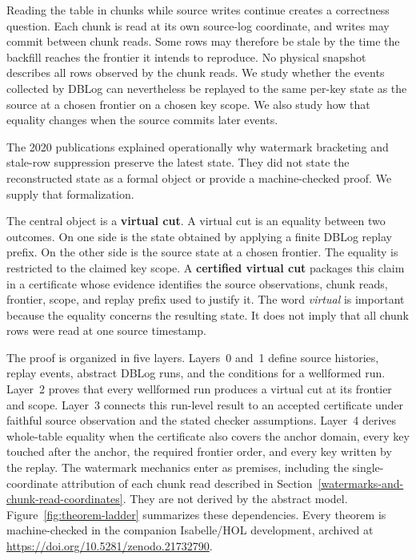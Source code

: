 \documentclass[letterpaper,10pt,twocolumn]{article}
\begin{document}
Reading the table in chunks while source writes continue creates a
correctness question. Each chunk is read at its own source-log
coordinate, and writes may commit between
chunk reads. Some rows may therefore be stale by the time the backfill
reaches the frontier it intends to reproduce. No physical snapshot
describes all rows observed by the chunk reads. We study whether the
events collected by DBLog can nevertheless be replayed to the same
per-key state as the source at a chosen frontier on a chosen key scope.
We also study how that equality changes when the source commits later
events.

The 2020 publications explained operationally why watermark bracketing
and stale-row suppression preserve the latest state. They did not state
the reconstructed state as a formal object or provide a machine-checked
proof. We supply that formalization.

The central object is a \textbf{virtual cut}. A virtual cut is an
equality between two outcomes. On one side is the state obtained by
applying a finite DBLog replay prefix. On the other side is the source
state at a chosen frontier. The equality is restricted to the claimed
key scope. A \textbf{certified virtual cut} packages this claim in a
certificate whose evidence identifies the source observations, chunk
reads, frontier, scope, and replay prefix used to justify it. The word
\emph{virtual} is important because the equality concerns the resulting
state. It does not imply that all chunk rows were read at one source
timestamp.

The proof is organized in five layers. Layers~0 and~1 define source
histories, replay events, abstract DBLog runs, and the conditions for a
wellformed run. Layer~2 proves that every wellformed run produces a
virtual cut at its frontier and scope. Layer~3 connects this run-level
result to an accepted certificate under faithful source observation and
the stated checker assumptions. Layer~4 derives whole-table equality
when the certificate also covers the anchor domain, every key touched
after the anchor, the required frontier order, and every key written by
the replay. The watermark mechanics enter as premises, including the
single-coordinate attribution of each chunk read described in
Section~\ref{watermarks-and-chunk-read-coordinates}. They are not
derived by the abstract model. Figure~\ref{fig:theorem-ladder}
summarizes these dependencies. Every theorem is machine-checked in the
companion Isabelle/HOL development, archived at
\url{https://doi.org/10.5281/zenodo.21732790}.
\end{document}

